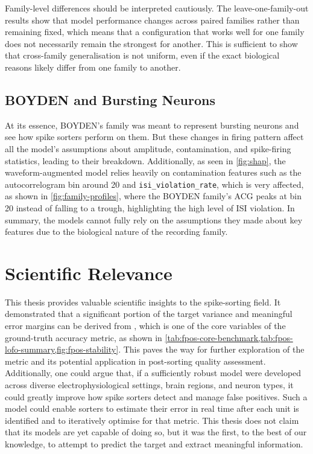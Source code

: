 Family-level differences should be interpreted cautiously. The leave-one-family-out results show that model performance changes across paired families rather than remaining fixed, which means that a configuration that works well for one family does not necessarily remain the strongest for another. This is sufficient to show that cross-family generalisation is not uniform, even if the exact biological reasons likely differ from one family to another.

\subsection{BOYDEN and Bursting Neurons}

At its essence, BOYDEN's family \parencite{doi:10.1152/jn.00650.2017} was meant to represent bursting neurons and see how spike sorters perform on them. But these changes in firing pattern affect all the model's assumptions about amplitude, contamination, and spike-firing statistics, leading to their breakdown. Additionally, as seen in \cref{fig:shap}, the waveform-augmented model relies heavily on contamination features such as the autocorrelogram bin around 20 and \texttt{isi\_violation\_rate}, which is very affected, as shown in \cref{fig:family-profiles}, where the BOYDEN family's ACG peaks at bin 20 instead of falling to a trough, highlighting the high level of ISI violation. In summary, the models cannot fully rely on the assumptions they made about key features due to the biological nature of the recording family.

\section{Scientific Relevance}

This thesis provides valuable scientific insights to the spike-sorting field. It demonstrated that a significant portion of the target variance and meaningful error margins can be derived from \fpos{}, which is one of the core variables of the ground-truth accuracy metric, as shown in \cref{tab:fpos-core-benchmark,tab:fpos-lofo-summary,fig:fpos-stability}. This paves the way for further exploration of the metric and its potential application in post-sorting quality assessment. Additionally, one could argue that, if a sufficiently robust model were developed across diverse electrophysiological settings, brain regions, and neuron types, it could greatly improve how spike sorters detect and manage false positives. Such a model could enable sorters to estimate their error in real time after each unit is identified and to iteratively optimise for that metric. This thesis does not claim that its models are yet capable of doing so, but it was the first, to the best of our knowledge, to attempt to predict the \fpos{} target and extract meaningful information.

